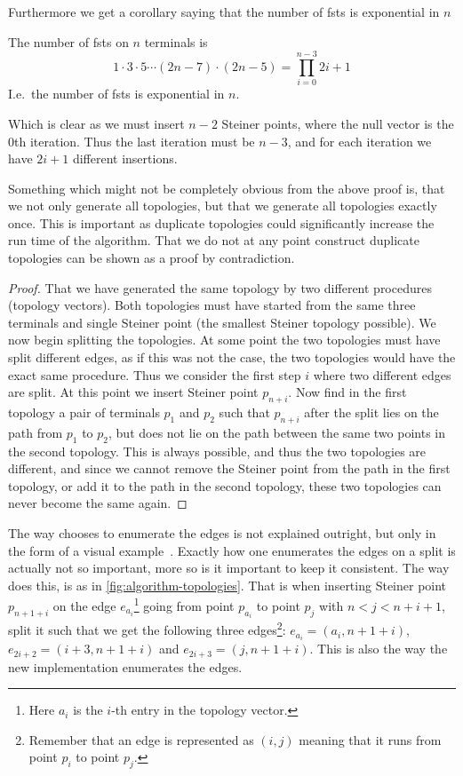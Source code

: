 Furthermore we get a corollary saying that the number of \acp{fst} is
exponential in $n$

\begin{corollary}
\label{cor:number-of-fsts}
The number of \acp{fst} on $n$ terminals is
%
\[
  1 \cdot 3 \cdot 5 \cdots (2n - 7) \cdot (2n - 5) = \prod_{i=0}^{n-3} 2i+1
\]
%
I.e.\ the number of \acp{fst} is exponential in $n$.
\end{corollary}

Which is clear as we must insert $n-2$ Steiner points, where the null vector is
the $0$th iteration. Thus the last iteration must be $n-3$, and for each
iteration we have $2i+1$ different insertions.

Something which might not be completely obvious from the above proof is, that we
not only generate all topologies, but that we generate all topologies exactly
once. This is important as duplicate topologies could significantly
increase the run time of the algorithm. That we do not at any point construct
duplicate topologies can be shown as a proof by contradiction.

\begin{proof}
  That we have generated the same topology by two different procedures (topology
  vectors). Both topologies must have started from the same three terminals and
  single Steiner point (the smallest Steiner topology possible). We now begin
  splitting the topologies. At some point the two topologies must have split
  different edges, as if this was not the case, the two topologies would have
  the exact same procedure. Thus we consider the first step $i$ where two
  different edges are split. At this point we insert Steiner point
  $p_{n+i}$. Now find in the first topology a pair of terminals $p_1$ and $p_2$
  such that $p_{n+i}$ after the split lies on the path from $p_1$ to $p_2$, but
  does not lie on the path between the same two points in the second
  topology. This is always possible, and thus the two topologies are different,
  and since we cannot remove the Steiner point from the path in the first
  topology, or add it to the path in the second topology, these two topologies
  can never become the same again.
\end{proof}


The way \citeauthor{smith1992} chooses to enumerate the edges is not explained
outright, but only in the form of a visual
example~\cite[p.~143]{smith1992}. Exactly how one enumerates the edges on a
split is actually not so important, more so is it important to keep it
consistent. The way \citeauthor{smith1992} does this, is as in
\cref{fig:algorithm-topologies}. That is when inserting Steiner point
$p_{n+1+i}$ on the edge $e_{a_i}$\footnote{Here $a_i$ is the $i$-th entry in the
  topology vector.} going from point $p_{a_i}$ to point $p_j$ with
$n < j < n+i+1$, split it such that we get the following three
edges\footnote{Remember that an edge is represented as $(i,j)$ meaning that it
  runs from point $p_i$ to point $p_j$.}: $e_{a_{i}} = (a_{i}, n+1+i)$,
$ e_{2i + 2} = (i+3,n+1+i)$ and $ e_{2i + 3} = (j,n+1+i)$. This is also the way
the new implementation enumerates the edges.

